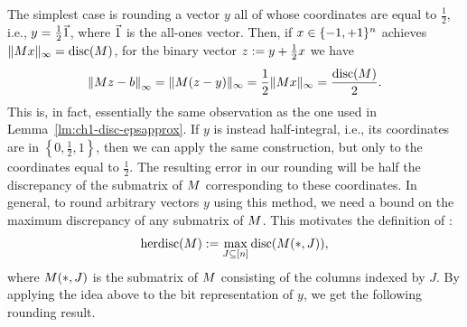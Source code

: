 The simplest case is rounding a vector $y$ all of whose coordinates are equal to $\frac12$, i.e., $y = \frac12 \vec{1}$, where $\vec{1}$ is the all-ones vector. Then, if $x \in \{-1,+1\}^n$ achieves $\|M x\|_\infty = \operatorname{disc}(M)$, for the binary vector $z :=  y + \frac12x$ we have
\[
\left\|M z - b\right\|_\infty = \|M(z-y)\|_\infty
= 
\frac12 \|M x\|_\infty = \frac{\operatorname{disc}(M)}{2}.
\]
This is, in fact, essentially the same observation as the one used in Lemma~\ref{lm:ch1-disc-epsapprox}. If $y$ is instead half-integral, i.e., its coordinates are in $\left\{0,\frac12, 1\right\}$, then we can apply the same construction, but only to the coordinates equal to $\frac12$. The resulting error in our rounding will be half the discrepancy of the submatrix of $M$ corresponding to these coordinates. In general, to round arbitrary vectors $y$ using this method, we need a bound on the maximum discrepancy of any submatrix of $M$. This motivates the definition of :
\[
\operatorname{herdisc}(M) := \max_{J \subseteq [n]}\operatorname{disc}(M(*,J)),
\]
where $M(*,J)$ is the submatrix of $M$ consisting of the columns indexed by $J$. By applying the idea above to the bit representation of $y$, we get the following rounding result. 

